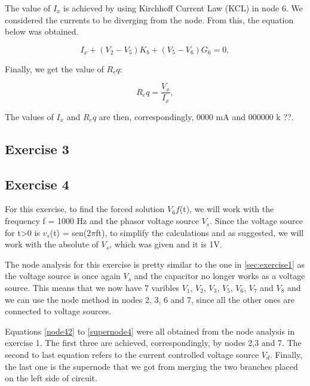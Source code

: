 The value of $I_x$ is achieved by using Kirchhoff Current Law (KCL) in node 6. We considered the currents to be diverging from the node. From this, the equation below was obtained.

\begin{equation}
  I_{x} + (V_{2} - V_{5})K_{b} + (V_{5} - V_{6})G_{6} = 0,
  \label{eq:ix2}
\end{equation}

Finally, we get the value of $R_eq$:

\begin{equation}
  R_eq = \frac{V_x}{I_x},
  \label{eq:ohm14}
\end{equation}

The values of $I_x$ and $R_eq$ are then, correspondingly, 0000 mA and 000000 k ??.


\subsection{Exercise 3}
\label{sec:exercise3}





\subsection{Exercise 4}
\label{sec:exercise4}



For this exercise, to find the forced solution $V_6f$(t), we will work with the frequency f = 1000 Hz and the phasor voltage source $V_s$. Since the voltage source for t>0 is $v_s$(t) = sen(2$\pi$ft), to simplify the calculations and as suggested, we will work with the absolute of $V_s$, which was given and it is 1V. 

The node analysis for this exercise is pretty similar to the one in \ref{sec:exercise1} as the voltage source is once again $V_s$ and the capacitor no longer works as a voltage source. This means that we now have 7 varibles $V_1$, $V_2$, $V_3$, $V_5$, $V_6$, $V_7$ and $V_8$ and we can use the node method in nodes 2, 3, 6 and 7, since all the other ones are connected to voltage sources.

Equations \ref{node42} to \ref{supernode4} were all obtained from the node analysis in exercise 1. The first three are achieved, correspondingly, by nodes 2,3 and 7. The second to last equation refers to the current controlled voltage source $V_d$. Finally, the last one is the supernode that we got from merging the two branches placed on the left side of circuit.


